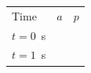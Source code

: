 {{\begin{center}
\begin{xtabular}[t]{|l|l|l|}
    
        Time &
    
    
        
                  \begin{math}a\end{math}
                 &
    
    
        
                  \begin{math}p\end{math}
     \tabularnewline{}
    
    
        \begin{math}t=0\end{math}~s &
    
    
         &
    
    
     \tabularnewline{}
    
    
        \begin{math}t=1\end{math}~s &
    

\end{xtabular}
\end{center}}}
